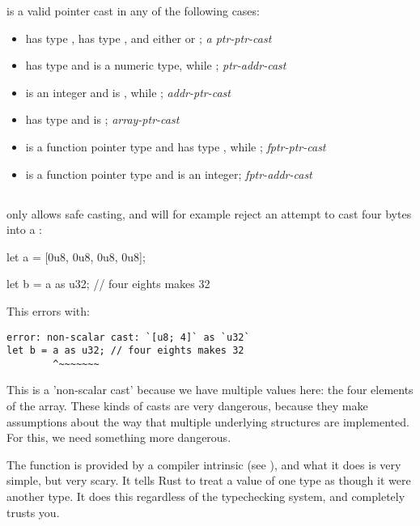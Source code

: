  is a valid pointer cast in any of the following cases:

\begin{itemize}
  \item{ has type ,  has type , and either  or ; 
      \emph{a ptr-ptr-cast}}
  \item{ has type  and  is a numeric type, while ; \emph{ptr-addr-cast}}
  \item{ is an integer and  is , while ; \emph{addr-ptr-cast}}
  \item{ has type \code{\&[T; n]} and  is ; \emph{array-ptr-cast}}
  \item{ is a function pointer type and  has type , while ; \emph{fptr-ptr-cast}}
  \item{ is a function pointer type and  is an integer; \emph{fptr-addr-cast}}
\end{itemize}

\subsection*{}

 only allows safe casting, and will for example reject an attempt to cast four bytes into a :

\begin{rustc}
let a = [0u8, 0u8, 0u8, 0u8];

let b = a as u32; // four eights makes 32
\end{rustc}

This errors with:

\begin{verbatim}
error: non-scalar cast: `[u8; 4]` as `u32`
let b = a as u32; // four eights makes 32
        ^~~~~~~~
\end{verbatim}

This is a 'non-scalar cast' because we have multiple values here: the four elements of the array. These kinds of casts are very 
dangerous, because they make assumptions about the way that multiple underlying structures are implemented. For this, we need 
something more dangerous.

\blank

The  function is provided by a compiler intrinsic (see ), and what it does is very 
simple, but very scary. It tells Rust to treat a value of one type as though it were another type. It does this regardless of the 
typechecking system, and completely trusts you.

